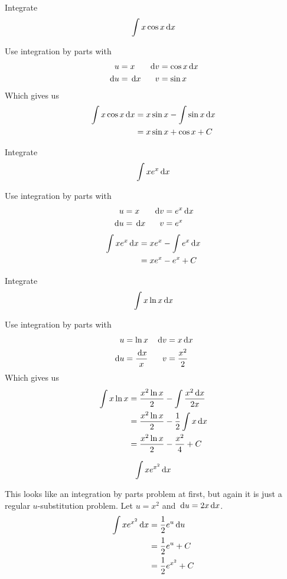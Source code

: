 \begin{ex}
  Integrate
  \[
    \int x \cos x \,\mathrm{d} x
    \]
    \begin{sol}
      Use integration by parts with
      \begin{align*}
        u &= x & \,\mathrm{d} v &= \cos x \,\mathrm{d} x \\
        \,\mathrm{d} u &= \,\mathrm{d} x & v &= \sin x
      \end{align*}
      Which gives us
      \begin{align*}
        \int x \cos x \,\mathrm{d} x &= x \sin x - \int \sin x \,\mathrm{d} x \\
        &= x \sin x + \cos x +C
      \end{align*}
    \end{sol}
\end{ex}
\begin{ex}
  Integrate
  \[
    \int x e^x \,\mathrm{d} x
    \]
    \begin{sol}
      Use integration by parts with
      \begin{align*}
        u&=x & \,\mathrm{d} v &= e^x \,\mathrm{d} x \\
        \,\mathrm{d} u &= \,\mathrm{d} x & v &= e^x
      \end{align*}
      \begin{align*}
        \int x e^x \,\mathrm{d} x &= x e^x -\int e^x \,\mathrm{d} x \\
        &=x e^x -e^x +C
      \end{align*}
    \end{sol}
\end{ex}
\begin{ex}
  Integrate
  \[
    \int x \ln x \,\mathrm{d} x
    \]
  \begin{sol}
    Use integration by parts with
    \begin{align*}
      u&= \ln x & \,\mathrm{d} v &= x \,\mathrm{d} x \\
      \,\mathrm{d} u &= \frac{\,\mathrm{d} x}{x} & v &= \frac{x^2}{2}
    \end{align*}
    Which gives us
    \begin{align*}
      \int x \ln x &= \frac{x^2 \ln x}{2}- \int \frac{x^2 \,\mathrm{d} x}{2x} \\
      &= \frac{x^2 \ln x}{2}-\frac{1}{2} \int x \,\mathrm{d} x \\
      &= \frac{x^2 \ln x}{2}-\frac{x^2}{4}+C
    \end{align*}
  \end{sol}
\end{ex}
\begin{ex}
  \[
    \int x e^{x^2} \,\mathrm{d} x
    \]
    \begin{sol}
      This looks like an integration by parts problem at first, but again it is just a regular $u$-substitution problem.
      Let $u=x^2$ and $\,\mathrm{d} u=2x\,\mathrm{d} x$.
      \begin{align*}
        \int x e^{x^2} \,\mathrm{d} x &= \frac{1}{2}e^u \,\mathrm{d} u \\
        &= \frac{1}{2} e^u +C \\
        &= \frac{1}{2}e^{x^2} +C
      \end{align*}
    \end{sol}
\end{ex}
